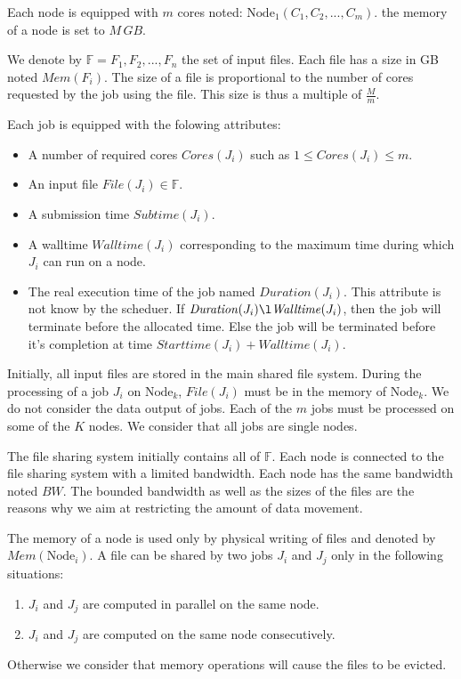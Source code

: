 \documentclass[conference,10pt]{IEEEtran}
\newcommand{\Node}[1]{\ensuremath{\mathrm{Node}_{#1}}\xspace}
\newcommand{\file}{\ensuremath{\mathit{File}}\xspace}
\newcommand{\memory}{\ensuremath{\mathit{Mem}}\xspace}
\newcommand{\duration}{\mathit{Duration}\xspace}
\newcommand{\bandwidth}{\mathit{BW}\xspace}
\newcommand{\core}{\mathit{Cores}\xspace}
\newcommand{\submissiontime}{\mathit{Subtime}\xspace}
\newcommand{\walltime}{\mathit{Walltime}\xspace}
\newcommand{\start}{\mathit{Starttime}\xspace}
\newcommand{\fileset}{\ensuremath{\mathbb{F}}\xspace}
\begin{document}
Each node is equipped with $m$ cores noted: $\Node{1}(C_1, C_2, ..., C_m)$.
the memory of a node is set to $M\,GB$.

We denote by $\fileset = F_1, F_2, ..., F_n$ the set of input files.
Each file has a size in GB noted $\memory(F_i)$.
The size of a file is proportional to the number of cores requested by the job using the file.
This size is thus a multiple of $\frac{M}{m}$.

Each job is equipped with the folowing attributes:
\begin{itemize}
	\item A number of required cores $\core(J_i)$ such as $1 \leq \core(J_i) \leq m$.
	\item An input file $\file(J_i) \in \fileset$.
	\item A submission time $\submissiontime(J_i)$.
	\item A walltime $\walltime(J_i)$ corresponding to the maximum time during which $J_i$ can run on a node.
	\item The real execution time of the job named $\duration(J_i)$. This attribute is not know by the scheduer. If $\duration(J_i) \l \walltime(J_i)$, then the job will terminate before the allocated time. Else the job will be terminated before it's completion at time $\start(J_i) + \walltime(J_i)$.
\end{itemize}

Initially, all input files are stored in the main shared file system.
During the processing of a job $J_i$ on $\Node{k}$,
$\file(J_i)$ must be in the memory of $\Node{k}$. 
We do not consider the data output of jobs.
Each of the $m$ jobs must be processed on some of the $K$ nodes. 
We consider that all jobs are single nodes.

The file sharing system initially contains all of $\fileset$.
Each node is connected to the file sharing system with a limited bandwidth.
Each node has the same bandwidth noted $\bandwidth$.
The bounded bandwidth as well as the sizes of the files are the reasons why
we aim at restricting the amount of data movement.

The memory of a node is used only by physical writing of files and denoted by $\memory(\Node{i})$.
A file can be shared by two jobs $J_i$ and $J_j$ only in the following situations:
\begin{enumerate}
	\item $J_i$ and $J_j$ are computed in parallel on the same node.
	\item $J_i$ and $J_j$ are computed on the same node consecutively.
\end{enumerate}
Otherwise we consider that memory operations will cause the files to be evicted.
\end{document}
